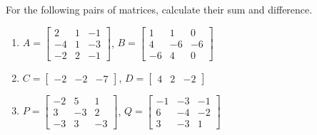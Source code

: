 \begin{exercise} \label{ex:} 
For the following pairs of matrices, calculate their sum and difference.
\begin{enumerate}
\item \(A=\begin{bmatrix} 2&1&-1
\\-4&1&-3
\\-2&2&-1 \end{bmatrix}\),
\(B=\begin{bmatrix} 1&1&0
\\4&-6&-6
\\-6&4&0 \end{bmatrix}\)


\item \(C=\begin{bmatrix} -2&-2&-7 \end{bmatrix}\),
\(D=\begin{bmatrix} 4&2&-2 \end{bmatrix}\)


\item \(P=\begin{bmatrix} -2&5&1
\\3&-3&2
\\-3&3&-3 \end{bmatrix}\),
\(Q=\begin{bmatrix} -1&-3&-1
\\6&-4&-2
\\3&-3&1 \end{bmatrix}\)



\end{enumerate}
\end{exercise}
